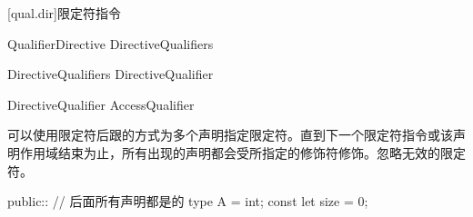 [qual.dir]{限定符指令}

\begin{bnf}{QualifierDirective}
    DirectiveQualifiers \terminal{::}
\end{bnf}

\begin{bnf}{DirectiveQualifiers}
    DirectiveQualifier\bnfp
\end{bnf}

\begin{bnf}{DirectiveQualifier}
    AccessQualifier
\end{bnf}

\pnum
可以使用限定符后跟\tcode{::}的方式为多个声明指定限定符。直到下一个限定符指令或该声明作用域结束为止，所有出现的声明都会受所指定的修饰符修饰。忽略无效的限定符。

\enterexample
\begin{codeblock}
public:: // 后面所有声明都是的
type A = int;
const let size = 0;
\end{codeblock}